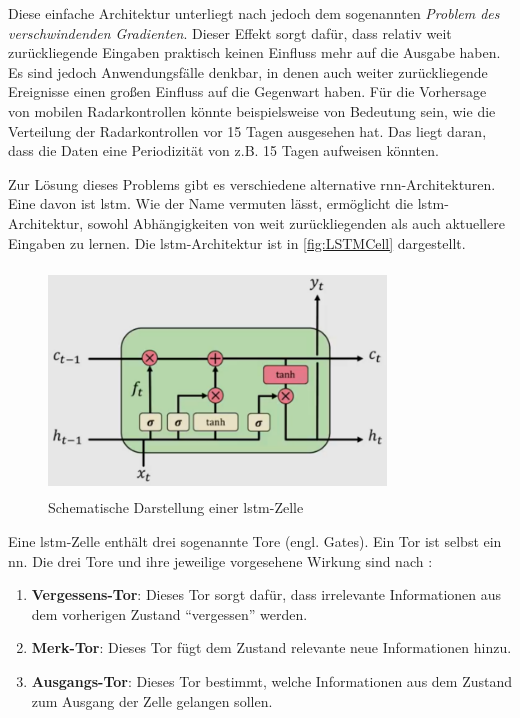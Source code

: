 Diese einfache Architektur unterliegt nach \cite[S. 260]{DeepLearningPythonKeras} jedoch dem sogenannten \emph{Problem des verschwindenden Gradienten}.
Dieser Effekt sorgt dafür, dass relativ weit zurückliegende Eingaben praktisch keinen Einfluss mehr auf die Ausgabe haben.
Es sind jedoch Anwendungsfälle denkbar, in denen auch weiter zurückliegende Ereignisse einen großen Einfluss auf die Gegenwart haben.
Für die Vorhersage von mobilen Radarkontrollen könnte beispielsweise von Bedeutung sein, wie die Verteilung der Radarkontrollen vor 15 Tagen ausgesehen hat.
Das liegt daran, dass die Daten eine Periodizität von z.B. 15 Tagen aufweisen könnten.

Zur Lösung dieses Problems gibt es verschiedene alternative \acrshort{rnn}-Architekturen.
Eine davon ist \acrfull{lstm}.
Wie der Name vermuten lässt, ermöglicht die \acrshort{lstm}-Architektur, sowohl Abhängigkeiten von weit zurückliegenden als auch aktuellere Eingaben zu lernen.
Die \acrshort{lstm}-Architektur ist in \autoref{fig:LSTMCell} dargestellt.

\begin{figure}[h]
    \centering
    \includegraphics[width=0.8\textwidth,height=6cm,keepaspectratio=true]{content/images/LSTMCell.png}
    \caption{Schematische Darstellung einer \acrshort{lstm}-Zelle \cite{6S191RNN}}
    \label{fig:LSTMCell}
\end{figure}

Eine \acrshort{lstm}-Zelle enthält drei sogenannte Tore (engl. Gates).
Ein Tor ist selbst ein \acrshort{nn}.
Die drei Tore und ihre jeweilige vorgesehene Wirkung sind nach \cite{6S191RNN}:

\begin{enumerate}
    \setlength\itemsep{0.2em}
    \item \textbf{Vergessens-Tor}: Dieses Tor sorgt dafür, dass irrelevante Informationen aus dem vorherigen Zustand "`vergessen"' werden.
    \item \textbf{Merk-Tor}: Dieses Tor fügt dem Zustand relevante neue Informationen hinzu.
    \item \textbf{Ausgangs-Tor}: Dieses Tor bestimmt, welche Informationen aus dem Zustand zum Ausgang der Zelle gelangen sollen.
\end{enumerate}

